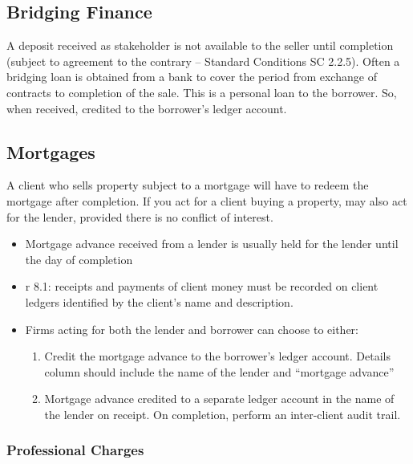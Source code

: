 \documentclass[
]{article}
\providecommand{\tightlist}{%
  \setlength{\itemsep}{0pt}\setlength{\parskip}{0pt}}
\begin{document}
\hypertarget{bridging-finance}{%
\subsection{Bridging Finance}\label{bridging-finance}}

A deposit received as stakeholder is not available to the seller until
completion (subject to agreement to the contrary -- Standard Conditions
SC 2.2.5). Often a bridging loan is obtained from a bank to cover the
period from exchange of contracts to completion of the sale. This is a
personal loan to the borrower. So, when received, credited to the
borrower's ledger account.

\hypertarget{mortgages}{%
\subsection{Mortgages}\label{mortgages}}

A client who sells property subject to a mortgage will have to redeem
the mortgage after completion. If you act for a client buying a
property, may also act for the lender, provided there is no conflict of
interest.

\begin{itemize}
\tightlist
\item
  Mortgage advance received from a lender is usually held for the lender
  until the day of completion
\item
  r 8.1: receipts and payments of client money must be recorded on
  client ledgers identified by the client's name and description.
\item
  Firms acting for both the lender and borrower can choose to either:

  \begin{enumerate}
  \def\labelenumi{\arabic{enumi}.}
  \tightlist
  \item
    Credit the mortgage advance to the borrower's ledger account.
    Details column should include the name of the lender and ``mortgage
    advance''
  \item
    Mortgage advance credited to a separate ledger account in the name
    of the lender on receipt. On completion, perform an inter-client
    audit trail.
  \end{enumerate}
\end{itemize}

\hypertarget{professional-charges}{%
\subsubsection{Professional Charges}\label{professional-charges}}
\end{document}
